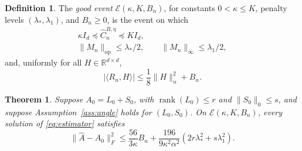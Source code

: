 \documentclass[12pt]{article}
\newtheorem{theorem}{Theorem}
\theoremstyle{definition}
\newtheorem{definition}{Definition}
\DeclareMathOperator{\rank}{rank}
\begin{document}
	\begin{definition}\label{def:good}
		The \emph{good event} $\mathcal E(\kappa,K,B_n)$, for constants $0<\kappa\le K$, penalty levels $(\lambda_*,\lambda_1)$, and $B_n\ge0$, is the event on which
		\begin{align}
			\kappa I_d\preceq\widehat C_n^{B,\eta}\preceq K I_d,\label{eq:curvature_event}\\
			\|M_n\|_{\mathrm{op}}\le\lambda_*/2,\qquad \|M_n\|_\infty\le\lambda_1/2,\label{eq:score_event}
		\end{align}
		and, uniformly for all $H\in\mathbb R^{d\times d}$,
		\begin{equation}
			|\langle R_n,H\rangle|\le\frac18\|H\|_n^2+B_n.\label{eq:remainder_event}
		\end{equation}
	\end{definition}
	
	
	\begin{theorem}\label{thm:det_exact}
		Suppose $A_0=L_0+S_0$, with $\rank(L_0)\le r$ and $\|S_0\|_0\le s$, and suppose Assumption~\ref{ass:angle} holds for $(L_0,S_0)$. On $\mathcal E(\kappa,K,B_n)$, every solution of \eqref{eq:estimator} satisfies
		\begin{equation}
			\|\widehat A-A_0\|_F^2 	\le \frac{56}{3\kappa}B_n
			+\frac{196}{9\kappa^2\alpha^2} \left(2r\lambda_*^2+s\lambda_1^2\right).
			\label{eq:det_exact}
		\end{equation}
	\end{theorem}
	
\end{document}
